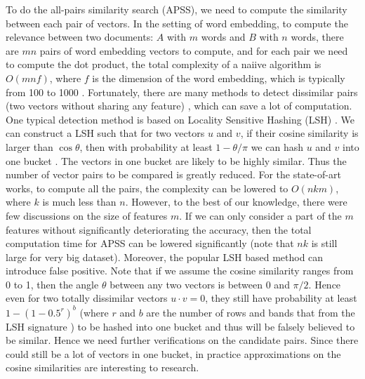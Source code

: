 \documentclass{article}
\begin{document}
To do the all-pairs similarity search (APSS), we need to compute the similarity between each pair of vectors. In the setting of word embedding, to compute the relevance between two documents: $A$ with $m$ words and $B$ with $n$ words, there are $mn$ pairs of word embedding vectors to compute, and for each pair we need to compute the dot product, the total complexity of a naiive algorithm is $O(mnf)$, where $f$ is the dimension of the word embedding, which is typically from 100 to 1000 \cite{MSC13}. Fortunately, there are many methods to detect dissimilar pairs (two vectors without sharing any feature) \cite{ATY13,TAJY14,Lin09}, which can save a lot of computation. 
{\color{black} One typical detection method is based on Locality Sensitive Hashing (LSH) \cite{LRU14}. We can construct a LSH such that for two vectors $u$ and $v$, if their cosine similarity is larger than $\cos \theta$, then with probability at least $1-\theta/\pi$ we can hash $u$ and $v$ into one bucket \cite{LRU14}. The vectors in one bucket are likely to be highly similar. Thus the number of vector pairs to be compared is greatly reduced.} 
For the state-of-art works, to compute all the pairs, the complexity can be lowered to $O(nkm)$, where $k$ is much less than $n$. However, to the best of our knowledge, there were few discussions on the size of features $m$. If we can only consider a part of the $m$ features without significantly deteriorating the accuracy, then the total computation time for APSS can be lowered significantly (note that $nk$ is still large for very big dataset). {\color{black}Moreover, the popular LSH based method can introduce false positive. Note that if we assume the cosine similarity ranges from 0 to 1, then the angle $\theta$ between any two vectors is between 0 and $\pi/2$. Hence even for two totally dissimilar vectors $u\cdot v = 0$, they still have probability at least $1 - (1-0.5^r)^b$ (where $r$ and $b$ are the number of rows and bands that from the LSH signature \cite{LRU14}) to be hashed into one bucket and thus will be falsely believed to be similar. Hence we need further verifications on the candidate pairs. Since there could still be a lot of vectors in one bucket, in practice approximations on the cosine similarities are interesting to research.}
\end{document}
